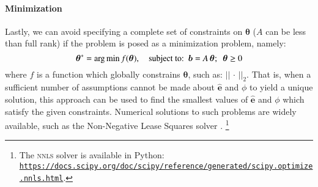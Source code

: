 \paragraph{Minimization}
Lastly, we can avoid specifying a complete set of constraints on $\bm{\theta}$
($A$ can be less than full rank)
if the problem is posed as a minimization problem, namely:
\begin{equation}\label{eq:system-optimize}
\bm{\theta}^{*} = {\arg \min}
\thinspace f(\bm{\theta}),
\quad \textrm{subject to:}
\enspace\bm{b} = A\thinspace\bm{\theta};
\enspace\bm{\theta} \ge 0
\end{equation}
where $f$ is a function which globally constrains $\bm{\theta}$,
such as: ${\left|\left| \,\cdot\, \right|\right|}_2$.
That is, when a sufficient number of assumptions cannot be made about $\bm{\hat{e}}$ and $\phi$
to yield a unique solution,
this approach can be used to find the smallest values of $\bm{\hat{e}}$ and $\phi$
which satisfy the given constraints.
Numerical solutions to such problems are widely available,
such as the Non-Negative Lease Squares solver \citep{Lawson1995}.%
\footnote{The \textsc{nnls} solver is available in Python:
   \href{https://docs.scipy.org/doc/scipy/reference/generated/scipy.optimize.nnls.html}
{\texttt{https://docs.scipy.org/doc/scipy/reference/generated/scipy.optimize.nnls.html}}.}
